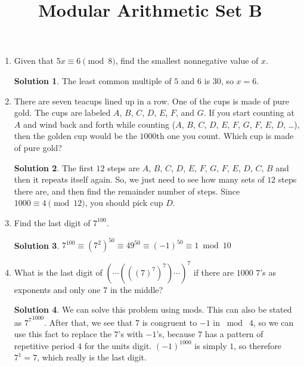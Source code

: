 \documentclass{article}
\title{Modular Arithmetic Set B}
\date{}
\author{}
\theoremstyle{definition}
\newtheorem*{solution}{Solution}
\begin{document}
\maketitle
\begin{multicols}{2}
    \raggedcolumns
    \begin{enumerate}
        \item Given that $5x \equiv 6 \pmod{8}$, find the smallest nonnegative value of $x$.
            \begin{solution}
                The least common multiple of $5$ and $6$ is $30$, so $x = 6$.
            \end{solution}
        \item There are seven teacups lined up in a row.
            One of the cups is made of pure gold.
            The cups are labeled $A$, $B$, $C$, $D$, $E$, $F$, and $G$.
            If you start counting at $A$ and wind back and forth while counting ($A$, $B$, $C$, $D$, $E$, $F$, $G$, $F$, $E$, $D$, \dots), then the golden cup would be the $1000$th one you count.
            Which cup is made of pure gold?
            \begin{solution}
                The first $12$ steps are $A$, $B$, $C$, $D$, $E$, $F$, $G$, $F$, $E$, $D$, $C$, $B$ and then it repeats itself again.
                So, we just need to see how many sets of $12$ steps there are, and then find the remainder number of steps.
                Since $1000 \equiv 4 \pmod{12}$, you should pick cup $D$.
            \end{solution}
        \item Find the last digit of $7^{100}$.
            \begin{solution}
                $7^{100} \equiv (7^2)^{50} \equiv 49^{50} \equiv (-1)^{50} \equiv 1 \bmod 10$
            \end{solution}
        \item What is the last digit of $(\cdots(((7)^7)^7)\cdots)^7$ if there are $1000$ $7$'s as exponents and only one $7$ in the middle?
            \begin{solution}
                We can solve this problem using mods.
                This can also be stated as ${7^7}^{1000}$.
                After that, we see that $7$ is congruent to $-1$ in $\bmod \; 4$, so we can use this fact to replace the $7$'s with $-1$'s, because $7$ has a pattern of repetitive period $4$ for the units digit.
                $(-1)^{1000}$ is simply $1$, so therefore $7^1 = 7$, which really is the last digit.
            \end{solution}

\end{enumerate}
\end{multicols}
\end{document}

